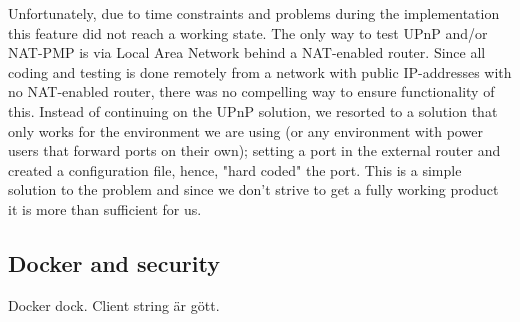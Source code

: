 Unfortunately, due to time constraints and problems during the implementation this feature did not reach a working state. The only way to test UPnP and/or NAT-PMP is via Local Area Network behind a NAT-enabled router. Since all coding and testing is done remotely from a network with public IP-addresses with no NAT-enabled router, there was no compelling way to ensure functionality of this. Instead of continuing on the UPnP solution, we resorted to a solution that only works for the environment we are using (or any environment with power users that forward ports on their own); setting a port in the external router and created a configuration file, hence, "hard coded" the port. This is a simple solution to the problem and since we don't strive to get a fully working product it is more than sufficient for us. 

\subsection{Docker and security}
Docker dock.
Client string är gött.
